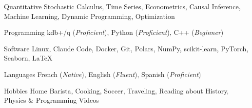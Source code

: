 

\begin{cvskills}
	\cvskill
	{Quantitative} %
	{Stochastic Calculus, Time Series, Econometrics, Causal Inference, Machine Learning, Dynamic Programming, Optimization} %

	\cvskill
	{Programming} %
	{kdb+/q (\textit{Proficient}), Python (\textit{Proficient}), C++ (\textit{Beginner})} %

	\cvskill
	{Software}
	{Linux, Claude Code, Docker, Git, Polars, NumPy, scikit-learn, PyTorch, Seaborn, LaTeX}

	\cvskill
	{Languages} %
	{French (\textit{Native}), English (\textit{Fluent}), Spanish (\textit{Proficient})} %

	\cvskill
	{Hobbies}
	{Home Barista, Cooking, Soccer, Traveling, Reading about History, Physics \& Programming Videos}
\end{cvskills}
